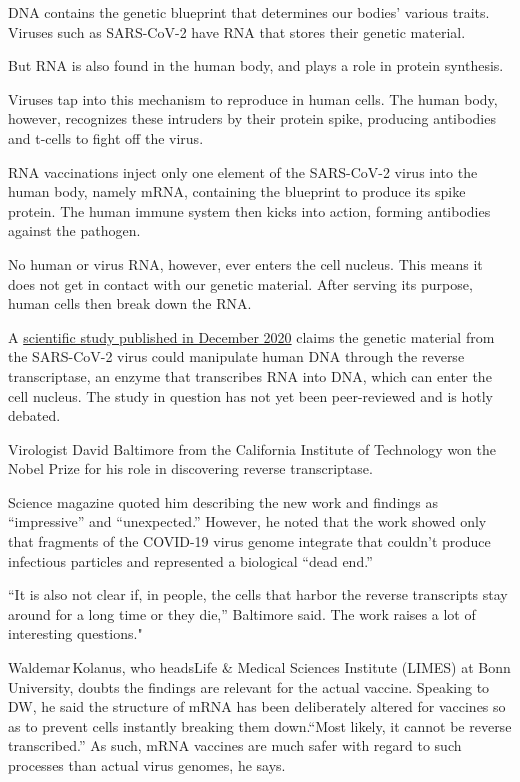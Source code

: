 \documentclass[
]{book}
\begin{document}
DNA contains the genetic blueprint that determines our bodies' various traits. Viruses such as SARS-CoV-2 have RNA that stores their genetic material.

But RNA is also found in the human body, and plays a role in protein synthesis.

Viruses tap into this mechanism to reproduce in human cells. The human body, however, recognizes these intruders by their protein spike, producing antibodies and t-cells to fight off the virus.

RNA vaccinations inject only one element of the SARS-CoV-2 virus into the human body, namely mRNA, containing the blueprint to produce its spike protein. The human immune system then kicks into action, forming antibodies against the pathogen.

No human or virus RNA, however, ever enters the cell nucleus. This means it does not get in contact with our genetic material. After serving its purpose, human cells then break down the RNA.

A \href{https://pubmed.ncbi.nlm.nih.gov/33330870/}{scientific study published in December 2020} claims the genetic material from the SARS-CoV-2 virus could manipulate human DNA through the reverse transcriptase, an enzyme that transcribes RNA into DNA, which can enter the cell nucleus. The study in question has not yet been peer-reviewed and is hotly debated.

Virologist David Baltimore from the California Institute of Technology won the Nobel Prize for his role in discovering reverse transcriptase.

Science magazine quoted him describing the new work and findings as ``impressive'' and ``unexpected.'' However, he noted that the work showed only that fragments of the COVID-19 virus genome integrate that couldn't produce infectious particles and represented a biological ``dead end.''

``It is also not clear if, in people, the cells that harbor the reverse transcripts stay around for a long time or they die,'' Baltimore said. The work raises a lot of interesting questions."

Waldemar\,Kolanus, who headsLife \& Medical Sciences Institute (LIMES) at Bonn University, doubts the findings are relevant for the actual vaccine. Speaking to DW, he said the structure of mRNA has been deliberately altered for vaccines so as to prevent cells instantly breaking them down.``Most likely, it cannot be reverse transcribed.'' As such, mRNA vaccines are much safer with regard to such processes than actual virus genomes, he says.
\end{document}
